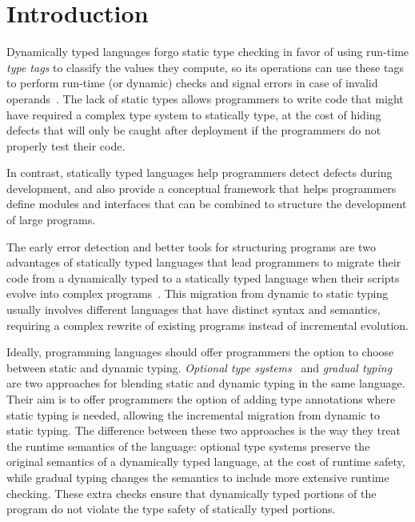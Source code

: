 \documentclass[10pt]{sigplanconf}
\begin{document}
\section{Introduction}
\label{sec:intro}

Dynamically typed languages forgo static type checking
in favor of using run-time {\em type tags} to classify
the values they compute, so its operations can use these
tags to perform run-time (or dynamic) checks and signal
errors in case of invalid operands~\cite{pierce2002tpl}.
The lack of static types allows programmers to write code
that might have required a complex type system to statically
type, at the cost of hiding defects that will only be caught
after deployment if the programmers do not properly
test their code.

In contrast, statically typed languages help programmers
detect defects during development, and also provide
a conceptual framework that helps programmers define modules
and interfaces that can be combined to structure the development
of large programs.

The early error detection and better tools for structuring
programs are two advantages of statically typed languages that
lead programmers to migrate their code from a dynamically
typed to a statically typed language when their scripts
evolve into complex programs~\cite{tobin-hochstadt2006ims}.
This migration from dynamic to static typing usually involves
different languages that have distinct syntax and semantics,
requiring a complex rewrite of existing programs instead of
incremental evolution.

Ideally, programming languages should offer programmers the
option to choose between static and dynamic typing.
\emph{Optional type systems}~\cite{bracha2004pluggable} and
\emph{gradual typing}~\cite{siek2006gradual} are two 
approaches for blending static and dynamic typing in the same
language. Their aim is to offer programmers the option
of adding type annotations where static typing is needed,
allowing the incremental migration from dynamic to static
typing. The difference between these two approaches is the
way they treat the runtime semantics of the language:
optional type systems preserve the original semantics
of a dynamically typed language, at the cost of runtime
safety, while gradual typing changes the semantics to
include more extensive runtime checking. These extra checks
ensure that
dynamically typed portions of the program do not violate
the type safety of statically typed portions.
\end{document}
